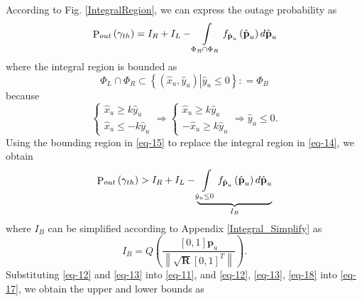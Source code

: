 \documentclass{IEEEtran}
\begin{document}
According to Fig. \ref{IntegralRegion}, we can express the outage probability as
\begin{equation}\label{eq-14}
\begin{split}
{{\mathop{\rm P}\nolimits} _{out}}\left( {{\gamma _{th}}} \right) =
{I_R} + {I_L} - \int\limits_{{\Phi _R} \cap {\Phi _R}} {{f_{\hat{ \textbf{p}}_u}}\left( \hat{ \textbf{p}}_u \right)d} \hat{ \textbf{p}}_u
\end{split}
\end{equation}
where the integral region is bounded as
\begin{equation}\label{eq-15}
  {\Phi _L} \cap {\Phi _R} \subset \left\{ {\left. {\left( {{{\hat x}_u},{{\hat y}_u}} \right)} \right|{{\hat y}_u} \le 0} \right\}: = {\Phi _B}
\end{equation}
because
\begin{equation}\label{eq-16}
\left\{ \begin{array}{l}
{{\hat x}_u} \ge k{{\hat y}_u}\\
{{\hat x}_u} \le  - k{{\hat y}_u}
\end{array} \right. \Rightarrow \left\{ \begin{array}{l}
{{\hat x}_u} \ge k{{\hat y}_u}\\
 - {{\hat x}_u} \ge k{{\hat y}_u}
\end{array} \right. \Rightarrow  {{\hat y}_u} \le 0.
\end{equation}
Using the bounding region in \eqref{eq-15} to replace the integral region in \eqref{eq-14}, we obtain
\begin{equation}\label{eq-17}
  {{\mathop{\rm P}\nolimits} _{out}}\left( {{\gamma _{th}}} \right) > {I_R} + {I_L} - \underbrace {\int\limits_{{{\hat y}_u} \le 0} {{f_{\hat{ \textbf{p}}_u}}\left( \hat{ \textbf{p}}_u \right)d} {\hat{ \textbf{p}}_u}}_{{I_B}}
\end{equation}
where $I_B$ can be simplified according to Appendix \ref{Integral_Simplify} as
\begin{equation}\label{eq-18}
  I_B = Q\left( {\frac{{\left[ {0,1} \right]{{\textbf{p}}_u}}}{{\left\| {\sqrt {\textbf{R}} {{\left[ {0,1} \right]}^T}} \right\|}}} \right).
\end{equation}
Substituting \eqref{eq-12} and \eqref{eq-13} into \eqref{eq-11}, and \eqref{eq-12}, \eqref{eq-13}, \eqref{eq-18} into \eqref{eq-17}, we obtain the upper and lower bounds as
\end{document}
